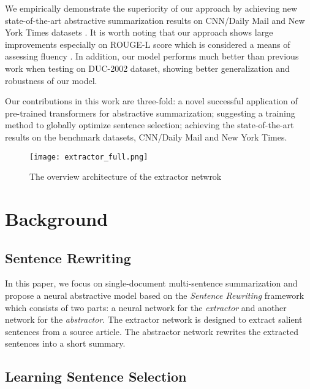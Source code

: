 \documentclass[11pt,a4paper]{article}
\begin{document}
We empirically demonstrate the superiority of our approach by achieving new state-of-the-art abstractive summarization results on CNN/Daily Mail and New York Times datasets \cite{NIPS2015_5945, durrett-etal-2016-learning}. It is worth noting that our approach shows large improvements especially on ROUGE-L score which is considered a means of assessing fluency \cite{narayan-etal-2018-ranking}.
In addition, our model performs much better than previous work when testing on DUC-2002 dataset, showing better generalization and robustness of our model.



Our contributions in this work are three-fold: 
a novel successful application of pre-trained transformers for abstractive summarization;
suggesting a training method to globally optimize sentence selection;
achieving the state-of-the-art results on the benchmark datasets, CNN/Daily Mail and New York Times.



\begin{figure*}[t]
\centering
\begin{center}
    \texttt{[image: extractor\_full.png]}
    \caption{The overview architecture of the extractor netwrok}
    \label{fig:extractor_full}
\end{center}
\end{figure*}

\section{Background}

\subsection{Sentence Rewriting}

In this paper, we focus on single-document multi-sentence summarization and propose
a neural abstractive model based on the \emph{Sentence Rewriting} framework 
\cite{chen-bansal-2018-fast, xu2019neural} which consists of two parts:
a neural network for the \emph{extractor} and another network for the \emph{abstractor}.
The extractor network is designed to extract salient sentences from a source article.
The abstractor network rewrites the extracted sentences
into a short summary.

\subsection{Learning Sentence Selection}
\label{sec:optimality}
\end{document}

